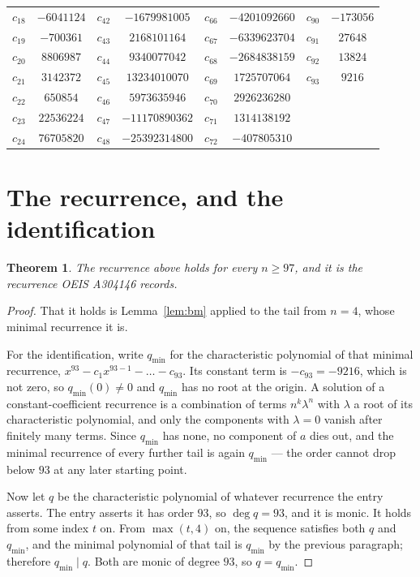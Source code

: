 \documentclass[11pt,a4paper]{article}
\theoremstyle{plain}
\newtheorem{theorem}{Theorem}
\theoremstyle{definition}
\begin{document}
\begin{center}
\begin{tabular}{cccccccc}
$c_{18}$ & $-6041124$ & $c_{42}$ & $-1679981005$ & $c_{66}$ & $-4201092660$ & $c_{90}$ & $-173056$ \\
$c_{19}$ & $-700361$ & $c_{43}$ & $2168101164$ & $c_{67}$ & $-6339623704$ & $c_{91}$ & $27648$ \\
$c_{20}$ & $8806987$ & $c_{44}$ & $9340077042$ & $c_{68}$ & $-2684838159$ & $c_{92}$ & $13824$ \\
$c_{21}$ & $3142372$ & $c_{45}$ & $13234010070$ & $c_{69}$ & $1725707064$ & $c_{93}$ & $9216$ \\
$c_{22}$ & $650854$ & $c_{46}$ & $5973635946$ & $c_{70}$ & $2926236280$ &  &  \\
$c_{23}$ & $22536224$ & $c_{47}$ & $-11170890362$ & $c_{71}$ & $1314138192$ &  &  \\
$c_{24}$ & $76705820$ & $c_{48}$ & $-25392314800$ & $c_{72}$ & $-407805310$ &  &  \\
\end{tabular}
\end{center}

\section{The recurrence, and the identification}

\begin{theorem}
The recurrence above holds for every $n\ge97$, and it is the recurrence OEIS A304146 records.
\end{theorem}

\begin{proof}
That it holds is Lemma~\ref{lem:bm} applied to the tail from $n=4$, whose minimal
recurrence it is.

For the identification, write $q_{\min}$ for the characteristic polynomial of that minimal
recurrence, $x^{93}-c_1x^{93-1}-\dots-c_{93}$. Its constant term is
$-c_{93}=-9216$, which is not zero, so $q_{\min}(0)\neq0$ and $q_{\min}$ has no
root at the origin. A solution of a constant-coefficient recurrence is a combination of terms
$n^{k}\lambda^{n}$ with $\lambda$ a root of its characteristic polynomial, and only the
components with $\lambda=0$ vanish after finitely many terms. Since $q_{\min}$ has none, no
component of $a$ dies out, and the minimal recurrence of every further tail is again
$q_{\min}$ --- the order cannot drop below $93$ at any later starting point.

Now let $q$ be the characteristic polynomial of whatever recurrence the entry asserts. The
entry asserts it has order $93$, so $\deg q=93$, and it is monic. It holds from some
index $t$ on. From $\max(t,4)$ on, the sequence satisfies both $q$ and $q_{\min}$, and
the minimal polynomial of that tail is $q_{\min}$ by the previous paragraph; therefore
$q_{\min}\mid q$. Both are monic of degree $93$, so $q=q_{\min}$.
\end{proof}
\end{document}
